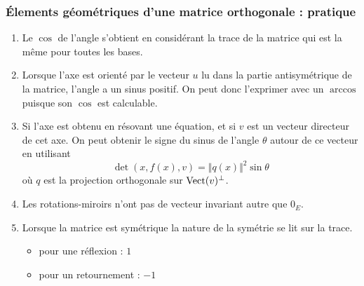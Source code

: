 \subsubsection{\'Elements géométriques d'une matrice orthogonale : pratique}
\begin{rems}
 \begin{enumerate}
 \item Le $\cos$ de l'angle s'obtient en considérant la trace de la matrice qui est la même pour toutes les bases.
\item Lorsque l'axe est orienté par le vecteur $u$ lu dans la partie antisymétrique de la matrice, l'angle a un sinus positif. On peut donc l'exprimer avec un $\arccos$ puisque son $\cos$ est calculable.
\item Si l'axe est obtenu en résovant une équation, et si $v$ est un vecteur directeur de cet axe. On peut obtenir le signe du sinus de l'angle $\theta$ autour de ce vecteur en utilisant
\begin{displaymath}
 \det(x,f(x),v)=\Vert q(x)\Vert^2\sin\theta
\end{displaymath}
où $q$ est la projection orthogonale sur $\mathop{\mathrm{Vect}}(v)^\bot$.
\item Les rotations-miroirs n'ont pas de vecteur invariant autre que $0_E$.
\item Lorsque la matrice est symétrique la nature de la symétrie se lit sur la trace.
\begin{itemize}
 \item pour une réflexion : $1$
\item pour un retournement : $-1$
\end{itemize}
\end{enumerate}
\end{rems}
